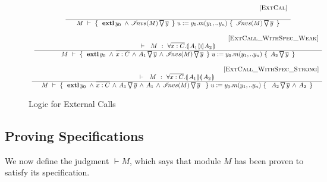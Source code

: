  





\small{
\begin{figure}[hbt]
$\begin{array}{c}
\inferruleSD{\hspace{4.7cm} [\sc{ExtCal}]}
	{ 
   	 
        }
	{   \hproves{M} 
						{ \    { \external{y_0} }\,     \wedge \,  \PushAS {y}{\extract{M}}\   }
						{ \ u:=y_0.m(y_1,.. y_n)\    }
						{ \    \PushAS {y}{\extract{M}}   \ }	
}
\\
\\
\inferruleSD{\hspace{4.7cm} [\sc{ExtCall\_WithSpec\_Weak}]}
	{ 
   	\promises M   {\TwoStatesQ {\overline {x:C}} {A_1}{A_2}}
        }
	{   \hproves{M} 
						{ \    { \external{y_0} }\, \wedge \, \overline {x:C}  \, \wedge \,  \PushAS  {y}{  A_1} \,   \wedge \,  \PushAS {y}{\extract{M}}\   }
						{ \ u:=y_0.m(y_1,.. y_n)\    }
						{ \ \PushAS  {y} { A_2}     \ }	
}
\\
\\
\inferruleSD{\hspace{4.7cm}[\sc{ExtCall\_WithSpec\_Strong}]}
	{        	
	\promises M   {\TwoStatesQ {\overline {x:C}} {A_1}{A_2}}
   	}
	{   \hproves{M} 
						{ \  {\external{y_0}  } \, \wedge\, \overline {x:C}\, \wedge\,  \PushAS  {y} { A_1} \, \wedge\,  A_1\, \wedge\,  \PushAS {y}{\extract{M}}\   \  }
						{ \ u:=y_0.m(y_1,.. y_n)\    }
						{ \  \ \PushAS  {y} { A_2}\,  \wedge\, A_2 \  }	
}\
\\
\end{array}
$
\caption{Logic for External Calls}
\label{f:external:calls}
\end{figure}
}




\subsection{Proving \SpecLang Specifications}

We now define the judgment $\vdash M$, which says that module $M$ has been proven to satisfy its specification.


